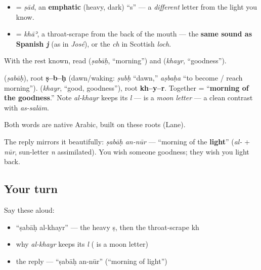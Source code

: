 \begin{itemize}
\raggedright
  \item \textbf{} = \emph{ṣād}, an \textbf{emphatic} (heavy, dark) \textquotedblleft{}s\textquotedblright{} — a \emph{different} letter from the light \textbf{} you know.
  \item \textbf{} = \emph{khāʾ}, a throat-scrape from the back of the mouth — the \textbf{same sound as Spanish \emph{j}} (as in \emph{José}), or the \emph{ch} in Scottish \emph{loch}.
\end{itemize}

With the rest known, read \textbf{} (\emph{ṣabāḥ}, \textquotedblleft{}morning\textquotedblright{}) and \textbf{} (\emph{khayr}, \textquotedblleft{}goodness\textquotedblright{}).

\begin{cousinweb}
\textbf{} (\emph{ṣabāḥ}), root \textbf{ṣ–b–ḥ} (dawn/waking: \emph{ṣubḥ} \textquotedblleft{}dawn,\textquotedblright{} \emph{aṣbaḥa} \textquotedblleft{}to become / reach morning\textquotedblright{}). \textbf{} (\emph{khayr}, \textquotedblleft{}good, goodness\textquotedblright{}), root \textbf{kh–y–r}. Together \textbf{ } = \textquotedblleft{}\textbf{morning of the goodness}.\textquotedblright{} Note \emph{al-khayr} keeps its \emph{l} — \textbf{} is a \emph{moon letter} — a clean contrast with \emph{as-salām}.

Both words are native Arabic, built on these roots (Lane).
\end{cousinweb}

\begin{culture}
The reply mirrors it beautifully: \emph{ṣabāḥ an-nūr} — \textquotedblleft{}morning of the \textbf{light}\textquotedblright{} (\emph{al-} + \emph{nūr}, sun-letter \emph{n} assimilated). You wish someone goodness; they wish you light back.
\end{culture}

\subsection*{Your turn}
Say these aloud:

\begin{itemize}
\raggedright
  \item \textquotedblleft{}ṣabāḥ al-khayr\textquotedblright{} — the heavy ṣ, then the throat-scrape kh
  \item why \emph{al-khayr} keeps its \emph{l} ( is a moon letter)
  \item the reply — \textquotedblleft{}ṣabāḥ an-nūr\textquotedblright{} (\textquotedblleft{}morning of light\textquotedblright{})
\end{itemize}

